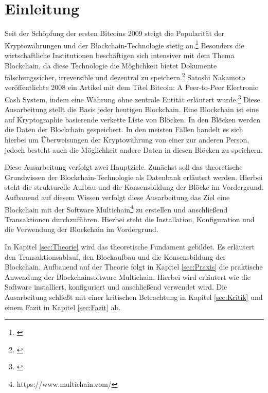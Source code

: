 \section{Einleitung}
\label{sec:Einleitung}
Seit der Sch{\"o}pfung der ersten Bitcoins 2009 steigt die Popularit{\"a}t der Kryptow{\"a}hrungen und der Blockchain-Technologie stetig an.\footnote{\cite[S.~312]{Neugebauer.2018}} Besonders die wirtschaftliche Institutionen besch{\"a}ftigen sich intensiver mit dem Thema Blockchain, da diese Technologie die M{\"o}glichkeit bietet Dokumente f{\"a}lschungssicher, irreversible und dezentral zu speichern.\footnote{\cite[S.~312]{Neugebauer.2018}} Satoshi Nakamoto ver{\"o}ffentlichte 2008 ein Artikel mit dem Titel {\glqq}Bitcoin: A Peer-to-Peer Electronic Cash System{\grqq}, indem eine W{\"a}hrung ohne zentrale Entit{\"a}t erl{\"a}utert wurde.\footnote{\cite[S.~1]{SatoshiNakamoto.}} Diese Ausarbeitung stellt die Basis jeder heutigen Blockchain. Eine Blockchain ist eine auf Kryptographie basierende verkette Liste von Blöcken. In den Blöcken werden die Daten der Blockchain gespeichert. In den meisten Fällen handelt es sich hierbei um Überweisungen der Kryptowährung von einer zur anderen Person, jedoch besteht auch die Möglichkeit andere Daten in diesen Blöcken zu speichern.

Diese Ausarbeitung verfolgt zwei Hauptziele. Zunächst soll das theoretische Grundwissen der Blockchain-Technologie als Datenbank erläutert werden. Hierbei steht die strukturelle Aufbau und die Konsensbildung der Blöcke im Vordergrund. Aufbauend auf diesem Wissen verfolgt diese Ausarbeitung das Ziel eine Blockchain mit der Software Multichain\footnote{https://www.multichain.com/} zu erstellen und anschließend Transaktionen durchzuführen. Hierbei steht die Installation, Konfiguration und die Verwendung der Blockchain im Vordergrund.

In Kapitel \ref{sec:Theorie} wird das theoretische Fundament gebildet. Es erläutert den Transaktionsablauf, den Blockaufbau und die Konsensbildung der Blockchain. Aufbauend auf der Theorie folgt in Kapitel \ref{sec:Praxis} die praktische Anwendung der Blockchainsoftware Multichain. Hierbei wird erläutert wie die Software installiert, konfiguriert und anschließend verwendet wird. Die Ausarbeitung schließt mit einer kritischen Betrachtung in Kapitel \ref{sec:Kritik} und einem Fazit in Kapitel \ref{sec:Fazit} ab.